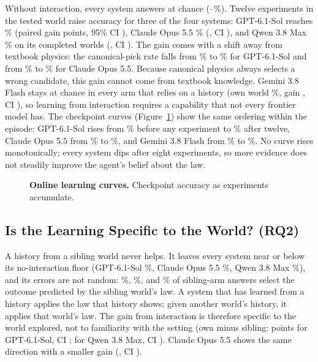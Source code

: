 Without interaction, every system answers at chance (--\%). Twelve experiments in the tested world raise accuracy for three of the four systems: GPT-6.1-Sol reaches \% (paired gain  points, 95\% CI ), Claude Opus 5.5 \% (, CI ), and Qwen 3.8 Max \% on its completed worlds (, CI ). The gain comes with a shift away from textbook physics: the canonical-pick rate falls from \% to \% for GPT-6.1-Sol and from \% to \% for Claude Opus 5.5. Because canonical physics always selects a wrong candidate, this gain cannot come from textbook knowledge. Gemini 3.8 Flash stays at chance in every arm that relies on a history (own world \%, gain , CI ), so learning from interaction requires a capability that not every frontier model has. The checkpoint curves (Figure~\ref{fig:curves}) show the same ordering within the episode: GPT-6.1-Sol rises from \% before any experiment to \% after twelve, Claude Opus 5.5 from \% to \%, and Gemini 3.8 Flash from \% to \%. No curve rises monotonically; every system dips after eight experiments, so more evidence does not steadily improve the agent's belief about the law.

\begin{figure}[t]
  \centering
  \caption{\textbf{Online learning curves.} Checkpoint accuracy as experiments accumulate. }
  \label{fig:curves}
\end{figure}

\subsection{Is the Learning Specific to the World? (RQ2)}

A history from a sibling world never helps. It leaves every system near or below its no-interaction floor (GPT-6.1-Sol \%, Claude Opus 5.5 \%, Qwen 3.8 Max \%), and its errors are not random: \%, \%, and \% of sibling-arm answers select the outcome predicted by the sibling world's law. A system that has learned from a history applies the law that history shows; given another world's history, it applies that world's law. The gain from interaction is therefore specific to the world explored, not to familiarity with the setting (own minus sibling:  points for GPT-6.1-Sol, CI ;  for Qwen 3.8 Max, CI ). Claude Opus 5.5 shows the same direction with a smaller gain (, CI ).

